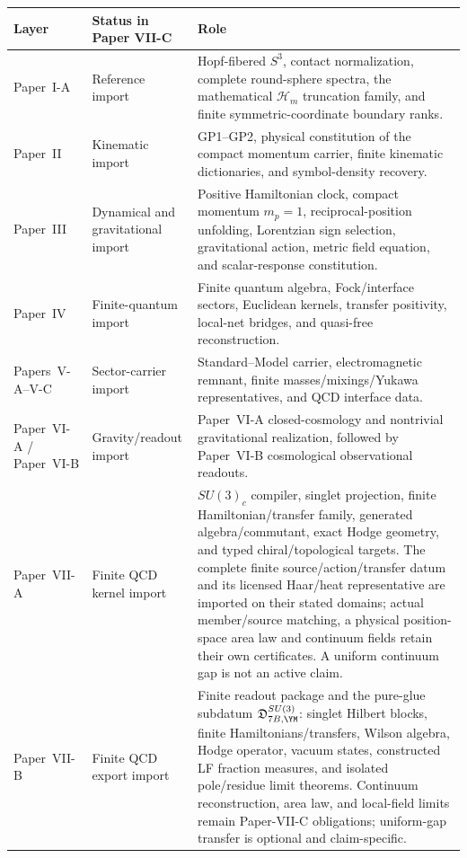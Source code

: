 \documentclass[12pt,a4paper]{article}
\begin{document}
\begin{table}[!htbp]
\centering
\small
\renewcommand{\arraystretch}{1.12}
\begin{tabularx}{\textwidth}{@{}p{}p{}X@{}}
\toprule
\textbf{Layer} & \textbf{Status in Paper VII-C} & \textbf{Role} \\
\midrule
Paper~I-A & Reference import & Hopf-fibered \(S^3\), contact normalization, complete round-sphere spectra, the mathematical \(\mathcal H_m\) truncation family, and finite symmetric-coordinate boundary ranks. \\
Paper~II & Kinematic import & GP1--GP2, physical constitution of the compact momentum carrier, finite kinematic dictionaries, and symbol-density recovery. \\
Paper~III & \makecell[l]{Dynamical and\\gravitational import} & Positive Hamiltonian clock, compact momentum \(m_p=1\), reciprocal-position unfolding, Lorentzian sign selection, gravitational action, metric field equation, and scalar-response constitution. \\
Paper~IV & Finite-quantum import & Finite quantum algebra, Fock/interface sectors, Euclidean kernels, transfer positivity, local-net bridges, and quasi-free reconstruction. \\
Papers~V-A--V-C & Sector-carrier import & Standard--Model carrier, electromagnetic remnant, finite masses/mixings/Yukawa representatives, and QCD interface data. \\
Paper~VI-A / Paper~VI-B & Gravity/readout import & Paper~VI-A closed-cosmology and nontrivial gravitational realization, followed by Paper~VI-B cosmological observational readouts. \\
Paper~VII-A & Finite QCD kernel import & \(SU(3)_c\) compiler, singlet projection, finite Hamiltonian/transfer family, generated algebra/commutant, exact Hodge geometry, and typed chiral/topological targets.  The complete finite source/action/transfer datum and its licensed Haar/heat representative are imported on their stated domains; actual member/source matching, a physical position-space area law and continuum fields retain their own certificates. A uniform continuum gap is not an active claim. \\
Paper~VII-B & Finite QCD export import & Finite readout package and the pure-glue subdatum \(\mathfrak D_{7B,\YM}^{SU(3)}\): singlet Hilbert blocks, finite Hamiltonians/transfers, Wilson algebra, Hodge operator, vacuum states, constructed LF fraction measures, and isolated pole/residue limit theorems.  Continuum reconstruction, area law, and local-field limits remain Paper-VII-C obligations; uniform-gap transfer is optional and claim-specific. \\

\end{tabularx}
\end{table}
\end{document}
